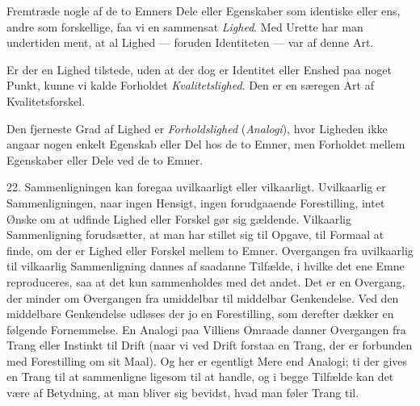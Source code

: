 \documentclass[12pt,a4paper]{book}
\newcommand{\apage}[1]{\marginnote{\footnotesize\textit{[#1]}}}
\begin{document}
Fremtræde nogle af de to Emners Dele eller Egenskaber som identiske
eller ens, andre som forskellige, faa vi en sammensat \emph{Lighed}. Med Urette har man undertiden ment, at al Lighed --- foruden Identiteten ---
var af denne Art.

Er der en Lighed tilstede, uden at der dog er Identitet eller Enshed paa
noget Punkt, kunne vi kalde Forholdet \emph{Kvalitetslighed}. Den er en
særegen Art af Kvalitetsforskel.

Den fjerneste Grad af Lighed er
\emph{Forholdslighed} (\emph{Analogi}), hvor Ligheden ikke angaar nogen
enkelt Egenskab eller Del hos de to Emner, men Forholdet mellem
Egenskaber eller Dele ved de to Emner.

22. Sammenligningen kan foregaa uvilkaarligt eller vilkaarligt.
Uvilkaarlig er Sammenligningen, naar ingen Hensigt, ingen forudgaaende
Forestilling, intet Ønske om at udfinde Lighed eller Forskel gør sig
gældende. Vilkaarlig Sammenligning forudsætter, at man har stillet sig
til Opgave, til Formaal at finde, om der er Lighed eller Forskel mellem
to Emner. Overgangen fra uvilkaarlig til vilkaarlig Sammenligning dannes
af saadanne Tilfælde, i hvilke det ene Emne reproduceres, saa at det kun
sammenholdes med det andet. Det er en Overgang, der minder om Overgangen
fra umiddelbar til middelbar Genkendelse. Ved den middelbare Genkendelse
udløses der jo en Forestilling, som derefter dækker en følgende
Fornemmelse. En Analogi paa Villiens Omraade danner Overgangen fra Trang
eller Instinkt til Drift (naar vi ved Drift forstaa en Trang, der er
forbunden med Forestilling om sit Maal). Og her er egentligt Mere end
Analogi; ti der gives en Trang til at sammenligne ligesom til at \apage{66} handle,
og i begge Tilfælde kan det være af Betydning, at man bliver sig
bevidst, hvad man føler Trang til.
\end{document}
